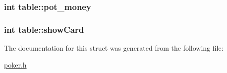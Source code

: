 \hypertarget{structtable_a742ffe5b682ef41e0d5284865d6f9707}{
\subsubsection[{pot\+\_\+money}]{\setlength{\rightskip}{0pt plus 5cm}int table\+::pot\+\_\+money}}\label{structtable_a742ffe5b682ef41e0d5284865d6f9707}
\hypertarget{structtable_a1d8bc65b5a26f8b5b7a21a2430432901}{
\subsubsection[{show\+Card}]{\setlength{\rightskip}{0pt plus 5cm}int table\+::show\+Card}}\label{structtable_a1d8bc65b5a26f8b5b7a21a2430432901}


The documentation for this struct was generated from the following file\+:\begin{DoxyCompactItemize}
\item 
\hyperlink{poker_8h}{poker.\+h}\end{DoxyCompactItemize}
